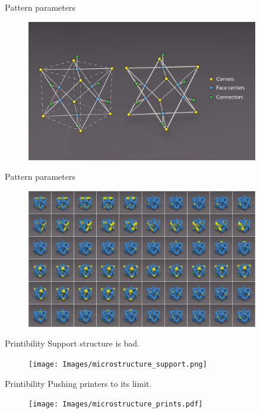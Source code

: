 \begin{frame}{Pattern parameters}
\begin{figure}
\includegraphics[width=0.9\textwidth]{Images/brick5_parameters.pdf}
\end{figure}
\end{frame}


\begin{frame}{Pattern parameters}
\begin{figure}
\hspace{\fill}
\includegraphics[width=0.9\textwidth]{Images/brick5_param.png}
\hspace{\fill}
\end{figure}
\end{frame}

\begin{frame}{Printibility}
Support structure is bad.
\begin{figure}
\texttt{[image: Images/microstructure\_support.png]}
\end{figure}
\end{frame}

\begin{frame}{Printibility}
Pushing printers to its limit.
\begin{figure}
\texttt{[image: Images/microstructure\_prints.pdf]}
\end{figure}
\end{frame}

